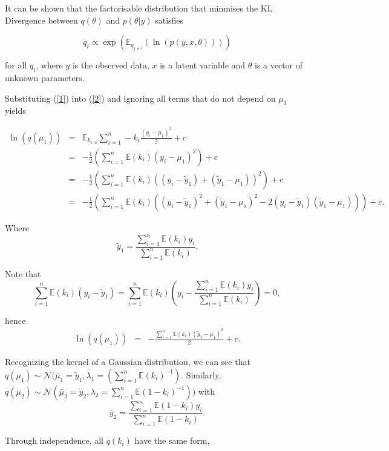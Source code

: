 \documentclass[12pt]{article}
\begin{document}
It can be shown that the factorisable distribution that minmises the KL Divergence between $q(\theta)$ and $p(\theta|y)$ satisfies

\begin{equation}
\label{2}
q_{i} \propto \exp (\mathbb{E}_{q_{j \neq i}} (\ln(p(y, x, \theta))))
\end{equation}

for all $q_{i}$, where $y$ is the observed data, $x$ is a latent variable and $\theta$ is a vector of unknown parameters.

Substituting (\ref{1}) into (\ref{2}) and ignoring all terms that do not depend on $\mu_1$ yields

\begin{eqnarray*}
\ln(q(\mu_1)) & = & \mathbb{E}_{k_{1:n}} \sum_{i=1}^{n} -k_i \frac{(y_i-\mu_1)^2}{2} + c  \\
& = & -\frac{1}{2} \left(\sum_{i=1}^{n}\mathbb{E}(k_i) (y_i-\mu_{1})^2\right) + c \\ 
& = & -\frac{1}{2}\left(\sum_{i=1}^{n}\mathbb{E}(k_i) ((y_i - \tilde{y}_1) + (\tilde{y}_1 - \mu_1))^2 \right)+ c \\
& = & -\frac{1}{2}\left(\sum_{i=1}^{n}\mathbb{E}(k_i) ((y_i - \tilde{y}_1)^2 + (\tilde{y}_1 - \mu_1)^2 - 2(y_i - \tilde{y}_1)(\tilde{y}_1 - \mu_1))\right) + c.
\end{eqnarray*}

Where
$$\tilde{y}_1 = \frac{\sum_{i=1}^{n} \mathbb{E}(k_i)y_i}{\sum_{i=1}^{n} \mathbb{E}(k_i)}.$$

Note that
$$\sum_{i=1}^{n}\mathbb{E}(k_i)(y_i - \tilde{y}_1) = \sum_{i=1}^{n}\mathbb{E}(k_i)\left(y_i - \frac{\sum_{i=1}^{n} \mathbb{E}(k_i)y_i}{\sum_{i=1}^{n} \mathbb{E}(k_i)}\right) = 0,$$

hence 
\begin{eqnarray*}
\ln(q(\mu_1)) & = & -\frac{\sum_{i=1}^{n}\mathbb{E}(k_i) (\tilde{y}_1-\mu_{1})^2}{2} + c.
\end{eqnarray*}


Recognizing the kernel of a Gaussian distribution, we can see that $q(\mu_1) \sim \mathcal{N} (\bar{\mu}_{1} = \tilde{y}_1, \lambda_{1} = (\sum_{i=1}^{n}\mathbb{E}(k_i)^{-1}).$
Similarly, $q(\mu_2) \sim \mathcal{N} (\bar{\mu}_{2} = \tilde{y}_2, \lambda_{2} = \sum_{i=1}^{n}\mathbb{E}(1-k_i)^{-1}))$ with
$$\tilde{y_2} = \frac{\sum_{i=1}^{n} \mathbb{E}(1-k_i)y_i}{\sum_{i=1}^{n} \mathbb{E}(1-k_i)}.$$

Through independence, all $q(k_i)$ have the same form,
\end{document}

